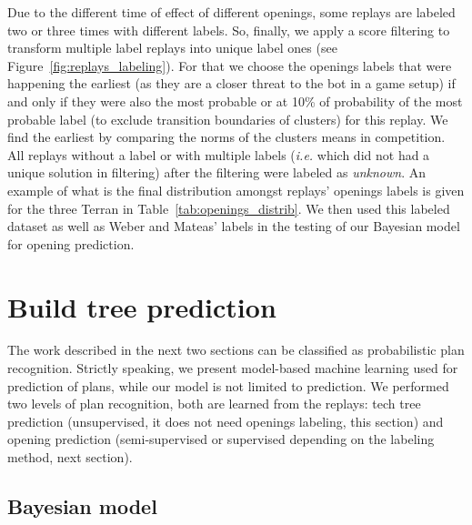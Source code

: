 Due to the different time of effect of different openings, some replays are labeled two or three times with different labels. So, finally, we apply a score filtering to transform multiple label replays into unique label ones (see Figure~\ref{fig:replays_labeling}). 
For that we choose the openings labels that were happening the earliest (as they are a closer threat to the bot in a game setup) if and only if they were also the most probable or at 10\% of probability of the most probable label (to exclude transition boundaries of clusters) for this replay. We find the earliest by comparing the norms of the clusters means in competition. All replays without a label or with multiple labels (\textit{i.e.} which did not had a unique solution in filtering) after the filtering were labeled as \textit{unknown}. An example of what is the final distribution amongst replays' openings labels is given for the three Terran  in Table~\ref{tab:openings_distrib}. We then used this labeled dataset as well as Weber and Mateas' labels in the testing of our Bayesian model for opening prediction.

\clearpage

\section{Build tree prediction}
\label{sec:strategyprediction}
The work described in the next two sections can be classified as probabilistic plan recognition. Strictly speaking, we present model-based machine learning used for prediction of plans, while our model is not limited to prediction. We performed two levels of plan recognition, both are learned from the replays: tech tree prediction (unsupervised, it does not need openings labeling, this section) and opening prediction (semi-supervised or supervised depending on the labeling method, next section).

\label{sec:techtreepred}

\subsection{Bayesian model}
